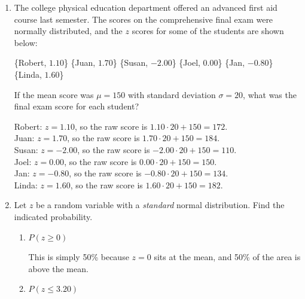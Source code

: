 \documentclass{article}
\newcommand{\answer}[1]{\color{red}#1}
\begin{document}
\begin{enumerate}
\item The college physical education department offered an advanced first aid course last semester.  The scores on the comprehensive final exam were normally distributed, and the $z$ scores for some of the students are shown below:
	\begin{center}
	\{Robert,  $1.10$\}  \{Juan, $1.70$\}  \{Susan, $-2.00$\}  \{Joel, $0.00$\}  \{Jan, $-0.80$\}  \{Linda, $1.60$\} 
	\end{center}
	
If the mean score was $\mu = 150$ with standard deviation $\sigma = 20$, what was the final exam score for each student? 

	{\answer Robert: $z= 1.10$, so the raw score is $1.10\cdot 20 + 150 = 172$.  \\
	Juan: $z= 1.70$, so the raw score is $1.70\cdot 20 + 150 = 184$.  \\
	Susan: $z= -2.00$, so the raw score is $-2.00\cdot 20 + 150 = 110$.  \\
	Joel: $z= 0.00$, so the raw score is $0.00\cdot 20 + 150 = 150$.  \\
	Jan: $z= -0.80$, so the raw score is $-0.80\cdot 20 + 150 = 134$.  \\
	Linda: $z= 1.60$, so the raw score is $1.60\cdot 20 + 150 = 182$.  
	} 

\item Let $z$ be a random variable with a {\em standard} normal distribution.  Find the indicated probability.
	\begin{enumerate}
	\item $P(z \geq 0)$ 
	
	{\answer This is simply 50\% because $z=0$ sits at the mean, and 50\% of the area is above the mean.
	} 
	
	\item $P(z \leq 3.20)$  
	

\end{enumerate}
\end{enumerate}
\end{document}
